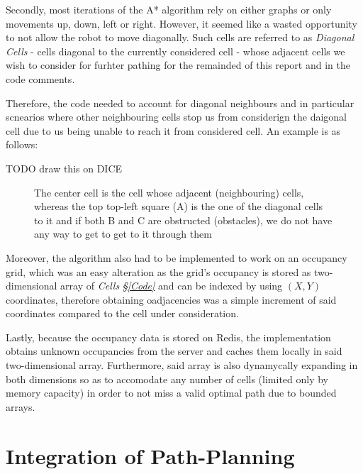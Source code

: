 \documentclass[11pt, a4paper]{article}
\begin{document}
Secondly, most iterations of the A* algorithm rely on either graphs\cite{path_astar_grid_no_grid}  or only movements up, down, left or right\cite{path_astar_grid_no_diagonals}. However, it seemed like a wasted opportunity to not allow the robot to move diagonally. Such cells are referred to as  \textit{Diagonal Cells} - cells diagonal to the currently considered cell - whose adjacent cells we wish to consider for furhter pathing for the remainded of this report and in the code comments. 

Therefore, the code needed to account for diagonal neighbours and in particular scnearios where other neighbouring cells stop us from considerign the daigonal cell due to us being unable to reach it from considered cell. An example is as follows:

TODO draw this on DICE

\begin{figure}
	  \caption{The center cell is the cell whose adjacent (neighbouring) cells, whereas the top top-left square (A) is the one of the diagonal cells to it and if both B and C are obstructed (obstacles), we do not have any way to get to get to it through them}
\end{figure} 

Moreover, the algorithm also had to be implemented to work on an occupancy grid, which was an easy alteration as the grid's occupancy is stored as two-dimensional array of \textit{Cells} \textit{\S\ref{Code}} and can be indexed by using $(X ,Y)$ coordinates, therefore obtaining oadjacencies was a simple increment of said coordinates compared to the cell under consideration.

Lastly, because the occupancy data is stored on Redis, the implementation obtains unknown occupancies from the server and caches them locally in said two-dimensional array. Furthermore, said array is also dynamycally expanding in both dimensions so as to accomodate any number of cells (limited only by memory capacity) in order to not miss a valid optimal path due to bounded arrays. 










\section{Integration of Path-Planning}
\end{document}
